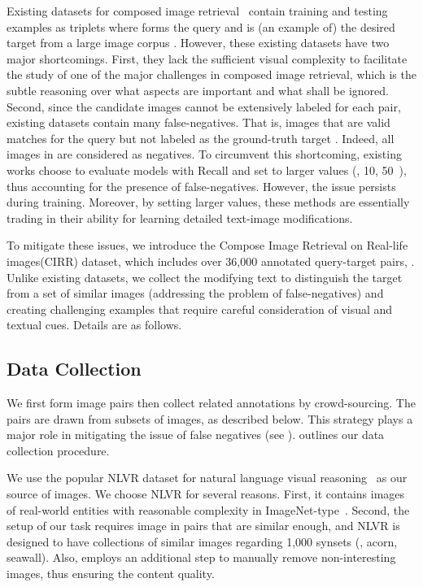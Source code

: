 \documentclass[10pt,twocolumn,letterpaper]{article}
\makeatletter
\renewcommand{\paragraph}{\@startsection{paragraph}{4}{\z@}{1.05ex \@plus 1ex \@minus .2ex}{-1em}{\normalfont\normalsize\bfseries}}
\newcommand{\dstname}{CIRR\xspace}
\newcommand{\dstnamefull}{Compose Image Retrieval on Real-life images\xspace}
\makeatother
\begin{document}
 Existing datasets for composed image retrieval~\cite{Vo_2019_tirg,fashioniq} contain training and testing examples as triplets  where  forms the query and  is (an example of) the desired target from a large image corpus .
 However, these existing datasets have two major shortcomings.
 First, they lack the sufficient visual complexity to facilitate the study of one of the major challenges in composed image retrieval, which is the subtle reasoning over what aspects are important and what shall be ignored.
 Second, since the candidate images cannot be extensively labeled for each  pair, existing datasets contain many false-negatives. That is, images  that are valid matches for the query but not labeled as the ground-truth target . Indeed, all images in  are considered as negatives. To circumvent this shortcoming, existing works choose to evaluate models with Recall and set  to larger values (\eg, 10, 50~\cite{fashioniq}), thus accounting for the presence of false-negatives. 
 However, the issue persists during training.
 Moreover, by setting larger  values, these methods are essentially trading in their ability for learning detailed text-image modifications.
 
 To mitigate these issues, we introduce the \dstnamefull (\dstname) dataset, which includes over 36,000 annotated query-target pairs, . Unlike existing datasets, we collect the modifying text to distinguish the target from a set of similar images (addressing the problem of false-negatives) and creating challenging examples that require careful consideration of visual and textual cues. Details are as follows.

 \subsection{Data Collection}
 We first form image pairs then collect related annotations by crowd-sourcing.
 The pairs are drawn from subsets of images, as described below. This strategy plays a major role in mitigating the issue of false negatives (see ).
  outlines our data collection procedure.
 
 \paragraph{Image source.} We use the popular NLVR dataset for natural language visual reasoning~\cite{Suhr_2019_nlvr2} as our source of images.
 We choose NLVR for several reasons. 
 First, it contains images of real-world entities with reasonable complexity in ImageNet-type~\cite{krizhevsky2012imagenet}. 
 Second, the setup of our task requires image in pairs that are similar enough, and NLVR is designed to have collections of similar images regarding 1,000 synsets (\eg, acorn, seawall). 
 Also, \citet{Suhr_2019_nlvr2} employs an additional step to manually remove non-interesting images, thus ensuring the content quality.
 
\end{document}
